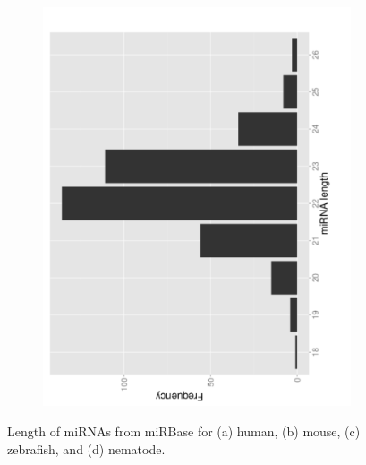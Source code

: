 \documentclass{article}
\begin{document}
\begin{figure}
\begin{subfigure}{.5\columnwidth}
      \caption{}
      \label{fig:zebrafish_mirna_length}
   \end{subfigure}%
   \begin{subfigure}{.5\columnwidth}
      \centering
      \includegraphics[width=.5\textwidth,natwidth=100,natheight=100,angle=270]{celegans_mirbase_length.pdf}
      \caption{}
      \label{fig:celegans_mirna_length}
   \end{subfigure}
   \caption{Length of miRNAs from miRBase for (a) human, (b) mouse, (c) zebrafish, and (d) nematode.}
   \label{fig:mirna_length}
\end{figure}
\end{document}
